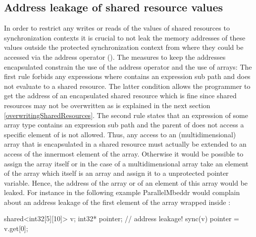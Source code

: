 \subsection{Address leakage of shared resource values}
In order to restrict any writes or reads of the values of shared resources to synchronization contexts it is crucial to not leak the memory addresses of these values outside the protected synchronization context from where they could be accessed via the address operator (\CODE{\&}). The measures to keep the addresses encapsulated constrain the use of the address operator and the use of arrays: The first rule forbids any expressions  where  contains an expression sub path  and  does not evaluate to a shared resource. The latter condition allows the programmer to get the address of an encapsulated shared resource which is fine since shared resources may not be overwritten as is explained in the next section \ref{overwritingSharedResources}. The second rule states that an expression  of some array type contains an expression sub path  and the parent of  does not access a specific element of  is not allowed. Thus, any access to an (multidimensional) array that is encapsulated in a shared resource must actually be extended to an access of the innermost element of the array. Otherwise it would be possible to assign the array itself or in the case of a multidimensional array take an element of the array which itself is an array and assign it to a unprotected pointer variable. Hence, the address of the array or of an element of this array would be leaked. For instance in the following example ParallelMbeddr would complain about an address leakage of the first element of the array wrapped inside :
\begin{ccode}
shared<int32[5][10]> v;
int32* pointer;
// address leakage!
sync(v) { pointer = v.get[0]; }
\end{ccode}

